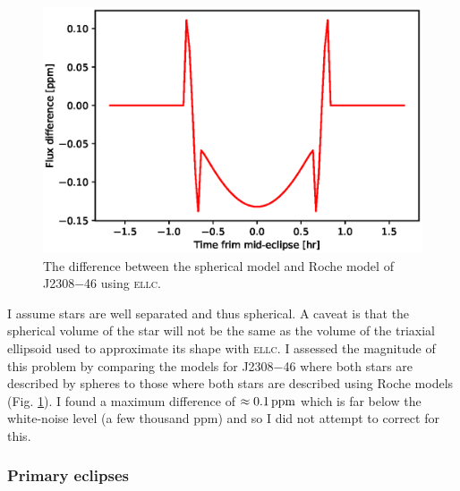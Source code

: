  \begin{figure}[htb]
  \centering
  \includegraphics[scale=1]{7-images/model_difference.eps}
  \caption {The difference between the spherical model and Roche model  of J2308$-$46 using \textsc{ellc}.}
  \label{methods:fig:model_diff}
\end{figure}
 
 
 I assume stars are well separated and thus spherical. A caveat is that the spherical volume of the star will not be the same as the volume of the triaxial ellipsoid used to approximate its shape with \textsc{ellc}. I assessed the magnitude of this problem by comparing the models for J2308$-$46 where both stars are described by spheres to those where both stars are described using Roche models (Fig. \ref{methods:fig:model_diff}).  I found a maximum difference of $\approx 0.1\, \rm ppm$ which is far below the white-noise level (a few thousand ppm) and so I did not attempt to correct for this. %
 
 \subsubsection{Primary eclipses}
 
